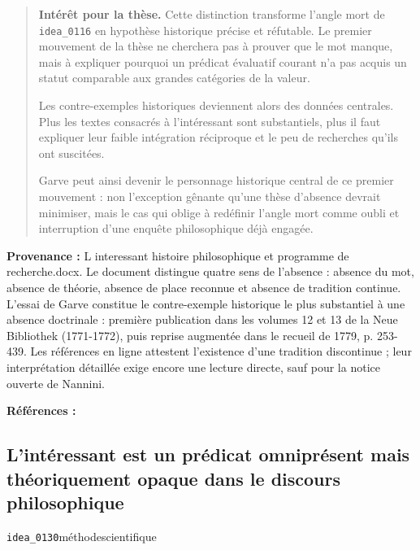\documentclass[10pt,a4paper]{article}
\begin{document}
\begin{quote}
\textbf{Intérêt pour la thèse.} Cette distinction transforme l'angle mort de \texttt{idea\_0116} en hypothèse historique précise et réfutable. Le premier mouvement de la thèse ne cherchera pas à prouver que le mot manque, mais à expliquer pourquoi un prédicat évaluatif courant n'a pas acquis un statut comparable aux grandes catégories de la valeur.

Les contre-exemples historiques deviennent alors des données centrales. Plus les textes consacrés à l'intéressant sont substantiels, plus il faut expliquer leur faible intégration réciproque et le peu de recherches qu'ils ont suscitées.

Garve peut ainsi devenir le personnage historique central de ce premier mouvement : non l'exception gênante qu'une thèse d'absence devrait minimiser, mais le cas qui oblige à redéfinir l'angle mort comme oubli et interruption d'une enquête philosophique déjà engagée.
\end{quote}
{\footnotesize\color{metadata}\textbf{Provenance :} L interessant histoire philosophique et programme de recherche.docx. Le document distingue quatre sens de l'absence : absence du mot, absence de théorie, absence de place reconnue et absence de tradition continue. L'essai de Garve constitue le contre-exemple historique le plus substantiel à une absence doctrinale : première publication dans les volumes 12 et 13 de la Neue Bibliothek (1771-1772), puis reprise augmentée dans le recueil de 1779, p. 253-439. Les références en ligne attestent l'existence d'une tradition discontinue ; leur interprétation détaillée exige encore une lecture directe, sauf pour la notice ouverte de Nannini.\par}
{\footnotesize\color{metadata}\textbf{Références :} \parencite{garve1779interessirende,nannini2018garve,bachmannmedick2008anziehungskraft,stace1944interestingness,kolnai1964concept,ngai2008merely,ngai2012categories,epstein2009interesting,grimm2011interesting,nannini2018interesting}\par}

\subsection{L'intéressant est un prédicat omniprésent mais théoriquement opaque dans le discours philosophique}
{\small\color{metadata} \texttt{idea\_0130}\quad\textbullet\quad méthode\quad\textbullet\quad scientifique\par}
\end{document}
